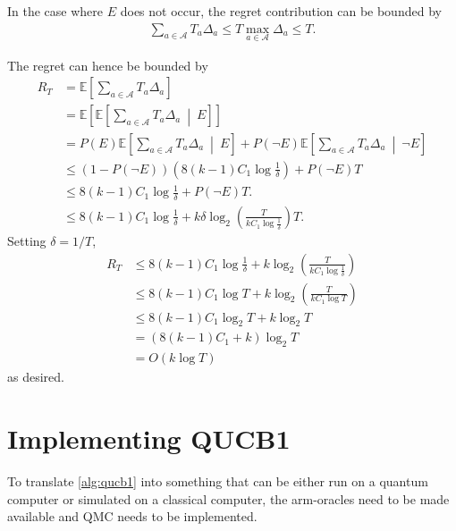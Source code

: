 In the case where $E$ does not occur, the regret contribution can be bounded by
\begin{equation}
    \begin{aligned}
        \sum_{a \in \mathcal{A}} T_a \Delta_a \leq T \max_{a\in \mathcal{A}} \Delta_a \leq T.
    \end{aligned}
\end{equation}

The regret can hence be bounded by
\begin{equation}
    \begin{aligned}
        R_T
         & =
        \mathbb{E}\left[ \sum_{a \in \mathcal{A}} T_a \Delta_a \right]
        \\
         & =
        \mathbb{E}\left[ \mathbb{E}\left[ \sum_{a \in \mathcal{A}} T_a \Delta_a \ \middle| \ E \right] \right]
        \\
         & = P(E) \mathbb{E}\left[ \sum_{a \in \mathcal{A}} T_a \Delta_a \ \middle| \ E \right] + P(\neg E) \mathbb{E}\left[ \sum_{a \in \mathcal{A}} T_a \Delta_a \ \middle| \ \neg E \right]
        \\
         & \leq
        (1 - P(\neg E)) \left( 8(k-1)C_1 \log \frac1\delta \right)
        + P(\neg E) T
        \\
         & \leq
        8(k-1)C_1 \log \frac1\delta + P(\neg E) T.
        \\
         & \leq
        8(k-1)C_1 \log \frac1\delta + k\delta \log_2 \left(\frac{T}{kC_1 \log \frac1\delta}\right) T.
    \end{aligned}
\end{equation}
Setting $\delta = 1/T$,
\begin{equation}
    \begin{aligned}
        R_T
         & \leq
        8(k-1)C_1 \log \frac1\delta + k \log_2 \left(\frac{T}{kC_1 \log \frac1\delta}\right)
        \\
         & \leq
        8(k-1)C_1 \log T + k \log_2 \left(\frac{T}{kC_1 \log T}\right)
        \\
         & \leq
        8(k-1)C_1 \log_2 T + k \log_2 T
        \\
         & =
        (8(k-1)C_1 + k) \log_2 T
        \\
         & =
        O(k \log T)
    \end{aligned}
\end{equation}
as desired.

\section{Implementing QUCB1}
To translate \cref{alg:qucb1} into something that can be either run on a quantum computer or simulated on a classical computer, the arm-oracles need to be made available and QMC needs to be implemented.

